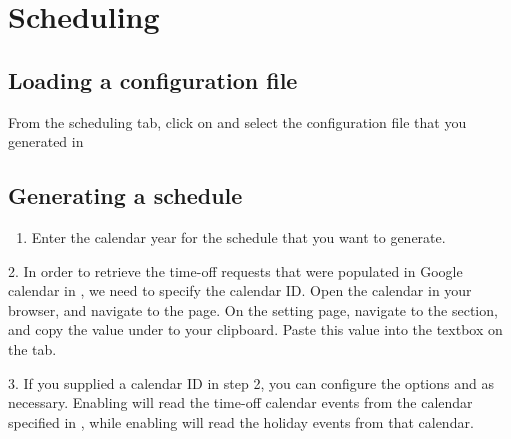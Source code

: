 \documentclass[letterpaper,10pt,english]{sphinxmanual}
\begin{document}
\section{Scheduling}
\label{\detokenize{index:scheduling}}

\subsection{Loading a configuration file}
\label{\detokenize{index:id4}}
From the scheduling tab, click on  and select the configuration
file that you generated in {\hyperref[\detokenize{index:clinician-configuration}]{}}

\begin{figure}[htbp]
\centering
{}\end{figure}

\begin{DUlineblock}{0em}
\item[] 
\end{DUlineblock}


\subsection{Generating a schedule}
\label{\detokenize{index:generating-a-schedule}}\label{\detokenize{index:id5}}\begin{enumerate}
\item {} 
Enter the calendar year for the schedule that you want to generate.

\end{enumerate}

2.  In order to retrieve the time-off requests that were populated
in Google calendar in {\hyperref[\detokenize{index:adding-clinician-requests}]{}}, we need to specify the
calendar ID. Open the calendar in your browser, and navigate to the
 page.
On the setting page, navigate to the  section, and copy
the value under  to your clipboard.
Paste this value into the  textbox on the 
tab.

3.  If you supplied a calendar ID in step 2, you can configure
the options  and  as necessary.
Enabling  will read the time-off calendar events
from the calendar specified in , while enabling
 will read the holiday events from that calendar.
\end{document}
